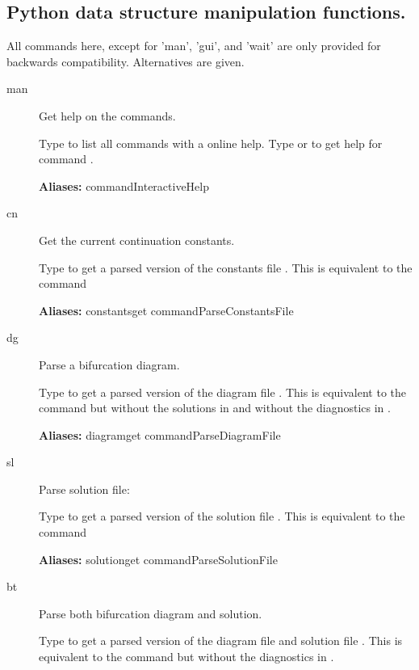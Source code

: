 \documentclass[12pt]{report}
\begin{document}
\subsection{Python data structure manipulation functions.}
\label{sec:clui_ref_python}
All commands here, except for 'man', 'gui', and 'wait' are only
provided for backwards compatibility. Alternatives are given.
\begin{description}
\item[man]
Get help on the \AUTO commands.
    
    Type  to list all commands with a online help.
    Type  or  to get help for command .

\textbf{Aliases:} commandInteractiveHelp

\item[cn]
Get the current continuation constants.

    Type  to get a parsed version of the constants file
    . This is equivalent to the command\\
    
\textbf{Aliases:} constantsget commandParseConstantsFile

\item[dg]
Parse a bifurcation diagram.

    Type  to get a parsed version of the diagram file .
    This is equivalent to the command  but without the
    solutions in  and without the diagnostics in .
    
\textbf{Aliases:} diagramget commandParseDiagramFile

\item[sl]
Parse solution file:

    Type  to get a parsed version of the solution file
    . This is equivalent to the command\\
    
\textbf{Aliases:} solutionget commandParseSolutionFile

\item[bt]
Parse both bifurcation diagram and solution.

    Type  to get a parsed version of the diagram file 
    and solution file .
    This is equivalent to the command  but without the
    diagnostics in .
    

\end{description}
\end{document}
